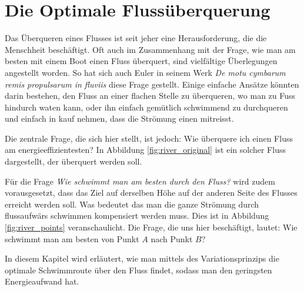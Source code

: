 %
%
%
%

\chapter{Die Optimale Flussüberquerung\label{chapter:schwimmen}}
\begin{refsection}


Das Überqueren eines Flusses ist seit jeher eine Herausforderung, die die Menschheit beschäftigt. Oft auch im Zusammenhang mit der Frage, wie man am besten mit einem Boot einen Fluss überquert, sind vielfältige Überlegungen angestellt worden. So hat sich auch Euler in seinem Werk \textit{De motu cymbarum remis propulsarum in fluviis} \cite{schwimmen:Euler_works} diese Frage gestellt. Einige einfache Ansätze könnten darin bestehen, den Fluss an einer flachen Stelle zu überqueren, wo man zu Fuss hindurch waten kann, oder ihn einfach gemütlich schwimmend zu durchqueren und einfach in kauf nehmen, dass die Strömung einen mitreisst.
	
	
Die zentrale Frage, die sich hier stellt, ist jedoch: Wie überquere ich einen Fluss am energieeffizientesten? In Abbildung \ref{fig:river_original} ist ein solcher Fluss dargestellt, der überquert werden soll.

%

Für die Frage \textit{Wie schwimmt man am besten durch den Fluss?} wird zudem vorausgesetzt, dass das Ziel auf derselben Höhe auf der anderen Seite des Flusses erreicht werden soll. Was bedeutet das man die ganze Strömung durch flussaufwärs schwimmen kompensiert werden muss. Dies ist in Abbildung \ref{fig:river_points} veranschaulicht. Die Frage, die uns hier beschäftigt, lautet: Wie schwimmt man am besten von Punkt \(A\) nach Punkt \(B\)?

%

In diesem Kapitel wird erläutert, wie man mittels des Variationsprinzips die optimale Schwimmroute über den Fluss findet, sodass man den geringsten Energieaufwand hat.






\printbibliography[heading=subbibliography]
\end{refsection}


